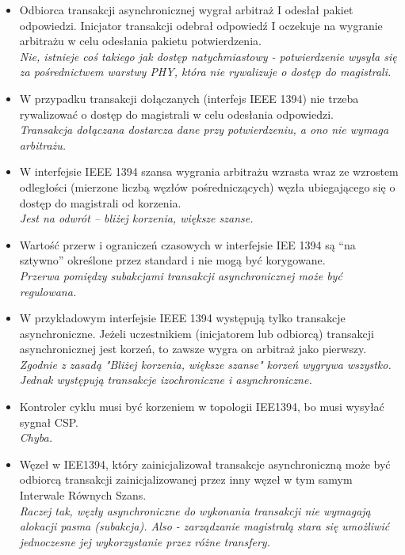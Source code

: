 \begin{itemize}
	\item \textcolor{nie}{Odbiorca transakcji asynchronicznej wygrał arbitraż I odesłał pakiet odpowiedzi. Inicjator transakcji odebrał odpowiedź I oczekuje na wygranie arbitrażu w celu odesłania pakietu potwierdzenia.} \\
	{\small \emph{Nie, istnieje coś takiego jak dostęp natychmiastowy - potwierdzenie wysyła się za pośrednictwem warstwy PHY, która nie rywalizuje o dostęp do magistrali.}}
	
	\item \textcolor{tak}{W przypadku transakcji dołączanych (interfejs IEEE 1394) nie trzeba rywalizować o dostęp do magistrali w celu odesłania odpowiedzi.} \\
	{\small \emph{Transakcja dołączana dostarcza dane przy potwierdzeniu, a ono nie wymaga arbitrażu.}}
	
	\item \textcolor{nie}{W interfejsie IEEE 1394 szansa wygrania arbitrażu wzrasta wraz ze wzrostem odległości (mierzone liczbą węzłów pośredniczących) węzła ubiegającego się o dostęp do magistrali od korzenia.} \\
	{\small \emph{Jest na odwrót – bliżej korzenia, większe szanse.}}
	
	\item \textcolor{nie}{Wartość przerw i ograniczeń czasowych w interfejsie IEE 1394 są “na sztywno” określone przez standard i nie mogą być korygowane.} \\
	{\small \emph{Przerwa pomiędzy subakcjami transakcji asynchronicznej może być regulowana.}}
	
	\item \textcolor{nie}{W przykładowym interfejsie IEEE 1394 występują tylko transakcje asynchroniczne. Jeżeli uczestnikiem (inicjatorem lub odbiorcą) transakcji asynchronicznej jest korzeń, to zawsze wygra on arbitraż jako pierwszy.} \\
	{\small \emph{Zgodnie z zasadą "Bliżej korzenia, większe szanse" korzeń wygrywa wszystko. Jednak występują transakcje izochroniczne i asynchroniczne.}}
	
	\item \textcolor{tak}{Kontroler cyklu musi być korzeniem w topologii IEE1394, bo musi wysyłać sygnał CSP.} \\
	{\small \emph{Chyba.}}
	
	\item \textcolor{tak}{Węzeł w IEE1394, który zainicjalizował transakcje asynchroniczną może być odbiorcą transakcji zainicjalizowanej przez inny węzeł w tym samym Interwale Równych Szans.} \\
	{\small \emph{Raczej tak, węzły asynchroniczne do wykonania transakcji nie wymagają alokacji pasma (subakcja). Also - zarządzanie magistralą stara się umożliwić jednoczesne jej wykorzystanie przez różne transfery.}}
	
\end{itemize}


